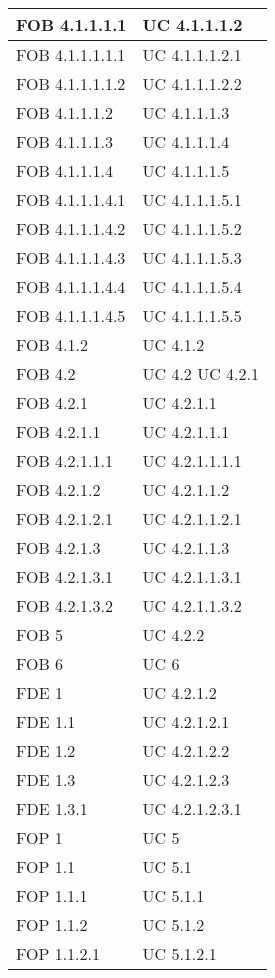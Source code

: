 \begin{longtable}{p{} p{}}
\midrule
FOB 4.1.1.1.1 & UC 4.1.1.1.2\\
\midrule
FOB 4.1.1.1.1.1 & UC 4.1.1.1.2.1\\
\midrule
FOB 4.1.1.1.1.2 & UC 4.1.1.1.2.2\\
\midrule
FOB 4.1.1.1.2 & UC 4.1.1.1.3\\
\midrule
FOB 4.1.1.1.3 & UC 4.1.1.1.4\\
\midrule
FOB 4.1.1.1.4 & UC 4.1.1.1.5\\
\midrule
FOB 4.1.1.1.4.1 & UC 4.1.1.1.5.1\\
\midrule
FOB 4.1.1.1.4.2 & UC 4.1.1.1.5.2\\
\midrule
FOB 4.1.1.1.4.3 & UC 4.1.1.1.5.3\\
\midrule
FOB 4.1.1.1.4.4 & UC 4.1.1.1.5.4\\
\midrule
FOB 4.1.1.1.4.5 & UC 4.1.1.1.5.5\\
\midrule
FOB 4.1.2 & UC 4.1.2\\
\midrule
FOB 4.2 & UC 4.2 \newline UC 4.2.1\\
\midrule
FOB 4.2.1 & UC 4.2.1.1\\
\midrule
FOB 4.2.1.1 & UC 4.2.1.1.1\\
\midrule
FOB 4.2.1.1.1 & UC 4.2.1.1.1.1\\
\midrule
FOB 4.2.1.2 & UC 4.2.1.1.2\\
\midrule
FOB 4.2.1.2.1 & UC 4.2.1.1.2.1\\
\midrule
FOB 4.2.1.3 & UC 4.2.1.1.3\\
\midrule
FOB 4.2.1.3.1 & UC 4.2.1.1.3.1\\
\midrule
FOB 4.2.1.3.2 & UC 4.2.1.1.3.2\\
\midrule
FOB 5 & UC 4.2.2\\
\midrule
FOB 6 & UC 6\\
\midrule
FDE 1 & UC 4.2.1.2\\
\midrule
FDE 1.1 & UC 4.2.1.2.1\\
\midrule
FDE 1.2 & UC 4.2.1.2.2\\
\midrule
FDE 1.3 & UC 4.2.1.2.3\\
\midrule
FDE 1.3.1 & UC 4.2.1.2.3.1\\
\midrule
FOP 1 & UC 5\\
\midrule
FOP 1.1 & UC 5.1\\
\midrule
FOP 1.1.1 & UC 5.1.1\\
\midrule
FOP 1.1.2 & UC 5.1.2\\
\midrule
FOP 1.1.2.1 & UC 5.1.2.1\\
\midrule

\end{longtable}
